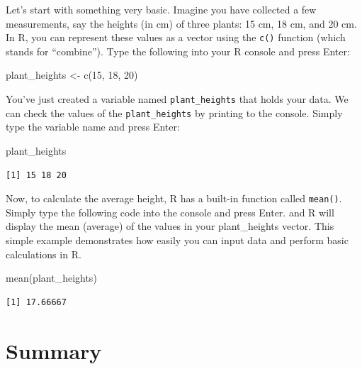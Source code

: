 \documentclass[
  letterpaper,
  DIV=11,
  numbers=noendperiod]{scrreprt}
\newenvironment{Shaded}{\begin{snugshade}}{\end{snugshade}}
\newcommand{\DecValTok}[1]{\textcolor[rgb]{0.68,0.00,0.00}{#1}}
\newcommand{\FunctionTok}[1]{\textcolor[rgb]{0.28,0.35,0.67}{#1}}
\newcommand{\NormalTok}[1]{\textcolor[rgb]{0.00,0.23,0.31}{#1}}
\newcommand{\OtherTok}[1]{\textcolor[rgb]{0.00,0.23,0.31}{#1}}
\begin{document}
Let's start with something very basic. Imagine you have collected a few
measurements, say the heights (in cm) of three plants: 15 cm, 18 cm, and
20 cm. In R, you can represent these values as a vector using the
\texttt{c()} function (which stands for ``combine''). Type the following
into your R console and press Enter:

\begin{Shaded}
\begin{Highlighting}[]
\NormalTok{plant\_heights }\OtherTok{\textless{}{-}} \FunctionTok{c}\NormalTok{(}\DecValTok{15}\NormalTok{, }\DecValTok{18}\NormalTok{, }\DecValTok{20}\NormalTok{)}
\end{Highlighting}
\end{Shaded}

You've just created a variable named \texttt{plant\_heights} that holds
your data. We can check the values of the \texttt{plant\_heights} by
printing to the console. Simply type the variable name and press Enter:

\begin{Shaded}
\begin{Highlighting}[]
\NormalTok{plant\_heights}
\end{Highlighting}
\end{Shaded}

\begin{verbatim}
[1] 15 18 20
\end{verbatim}

Now, to calculate the average height, R has a built-in function called
\texttt{mean()}. Simply type the following code into the console and
press Enter. and R will display the mean (average) of the values in your
plant\_heights vector. This simple example demonstrates how easily you
can input data and perform basic calculations in R.

\begin{Shaded}
\begin{Highlighting}[]
\FunctionTok{mean}\NormalTok{(plant\_heights)}
\end{Highlighting}
\end{Shaded}

\begin{verbatim}
[1] 17.66667
\end{verbatim}


\chapter{Summary}\label{summary}
\end{document}
